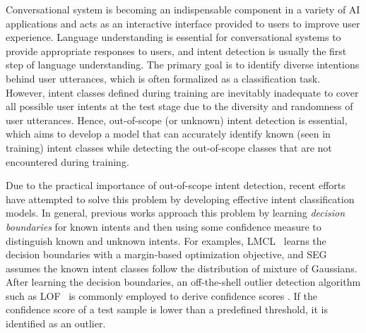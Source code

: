 

Conversational system is becoming an indispensable component in a variety of AI applications and acts as an interactive interface provided to users to improve user experience. Language understanding is essential for conversational systems to provide appropriate responses to users, and intent detection is usually the first step of language understanding. The primary goal is to identify diverse intentions behind user utterances, which is often formalized as a classification task. However, intent classes defined during training are inevitably inadequate to cover all possible user intents at the test stage due to the diversity and randomness of user utterances. Hence, out-of-scope (or unknown) intent detection is essential, which aims to develop a model that can accurately identify known (seen in training) intent classes while detecting the out-of-scope classes that are not encountered during training.

Due to the practical importance of out-of-scope intent detection, recent efforts have attempted to solve this problem by developing effective intent classification models. In general, previous works approach this problem by learning \emph{decision boundaries} for known intents and then using some confidence measure to distinguish known and unknown intents. For examples, LMCL~\citep{DBLP:conf/acl/LinX19} learns the decision boundaries with a margin-based optimization objective, and SEG~\citep{yan-etal-2020-unknown} assumes the known intent classes follow the distribution of mixture of Gaussians. After learning the decision boundaries, an off-the-shell outlier detection algorithm such as LOF~\citep{10.1145/335191.335388} is commonly employed to derive confidence scores  \cite{yan-etal-2020-unknown,DBLP:conf/emnlp/ShuXL17, DBLP:conf/acl/LinX19, DBLP:conf/iclr/HendrycksG17}.
If the confidence score of a test sample is lower than a predefined threshold, it is identified as an outlier. 

